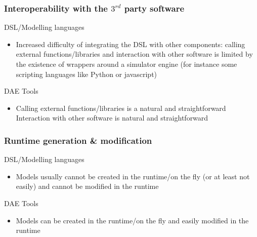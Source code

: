 \documentclass{beamer}
\begin{document}
\begin{frame}
\frametitle{Interoperability with the $3^{rd}$ party software}
\begin{block}{\textcolor{light_red}{DSL/Modelling languages}}
\begin{itemize}
  \item Increased difficulty of integrating the DSL with other components: calling external functions/libraries and interaction with
        other software is limited by the existence of wrappers around a simulator engine (for instance some scripting languages like
        Python or javascript)
\end{itemize}
\end{block}

\begin{block}{\textcolor{light_green}{DAE Tools}}
\begin{itemize}
  \item Calling external functions/libraries is a natural and straightforward Interaction with other software is
        natural and straightforward
\end{itemize}
\end{block}
\end{frame}

\begin{frame}
\frametitle{Runtime generation \& modification}
\begin{block}{\textcolor{light_red}{DSL/Modelling languages}}
\begin{itemize}
  \item Models usually cannot be created in the runtime/on the fly (or at least not easily) 
        and cannot be modified in the runtime
\end{itemize}
\end{block}

\begin{block}{\textcolor{light_green}{DAE Tools}}
\begin{itemize}
  \item Models can be created in the runtime/on the fly and easily modified in the runtime
\end{itemize}
\end{block}
\end{frame}
\end{document}
